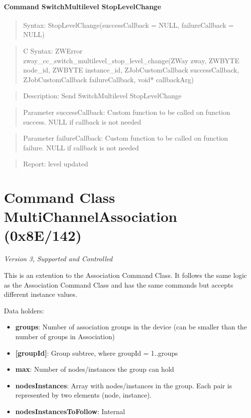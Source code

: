\paragraph{Command SwitchMultilevel StopLevelChange}
\begin{quote}Syntax: StopLevelChange(successCallback = NULL, failureCallback = NULL)\end{quote}
\begin{quote}C Syntax: ZWError zway\_cc\_switch\_multilevel\_stop\_level\_change(ZWay zway, ZWBYTE node\_id, ZWBYTE instance\_id, ZJobCustomCallback successCallback, ZJobCustomCallback failureCallback, void* callbackArg)\end{quote}
\begin{quote}Description: Send SwitchMultilevel StopLevelChange\end{quote}
\begin{quote}Parameter successCallback: Custom function to be called on function success. NULL if callback is not needed\end{quote}
\begin{quote}Parameter failureCallback: Custom function to be called on function failure. NULL if callback is not needed\end{quote}
\begin{quote}Report: level updated\end{quote}


\section{Command Class MultiChannelAssociation (0x8E/142)}

\textit{Version 3, Supported and Controlled}
\newline

This is an extention to the Association Command Class. It follows the same logic as the Association Command Class and has the same commands but accepts different instance values.
\newline

\noindent
Data holders:

\begin{itemize}
\item \textbf{groups}: Number of association groups in the device (can be smaller than the number of groups in Association)
\item \textbf{[groupId]}: Group subtree, where groupId = 1..groups
\item \qquad\textbf{max}: Number of nodes/instances the group can hold
\item \qquad\textbf{nodesInstances}: Array with nodes/instances in the group. Each pair is represented by two elements (node, instance).
\item \qquad\textbf{nodesInstancesToFollow}: Internal
\end{itemize}

